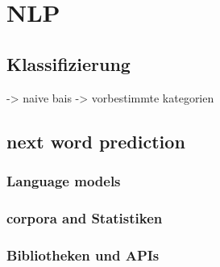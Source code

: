 \section{NLP}

	\subsection{Klassifizierung}
    	-> naive bais
        -> vorbestimmte kategorien
        
	\subsection{next word prediction}
		\subsubsection{Language models}
		\subsubsection{corpora and Statistiken}
		\subsubsection{Bibliotheken und APIs}